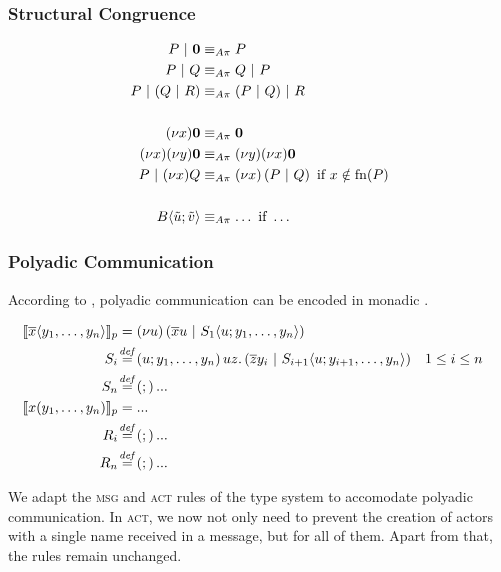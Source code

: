 \subsubsection{Structural Congruence}

\begin{align*}
  P \apar \anullproc
    &\astructequ P \\
  P \apar Q
    &\astructequ Q \apar P \\
  P \apar (Q \apar R)
    &\astructequ (P \apar Q) \apar R \\
  \\
  \anew{x}{\anullproc}
    &\astructequ \anullproc \\
  \anew{x}{\anew{y}{\anullproc}}
    &\astructequ \anew{y}{\anew{x}{\anullproc}} \\
  P \apar \anew{x}{Q}
    &\astructequ \anew*{x}{P \apar Q} \text{ if } x \notin \fn{P} \\
  \\
  \ains{B}{\tilde{u}}{\tilde{v}}
    &\astructequ \ldots \text{ if } \ldots %
\end{align*}


\subsubsection{Polyadic Communication}

According to \cite{agha_algebraic_2004},
polyadic communication can be encoded in monadic \actorpicalc.

\begin{align*}
  \encPolyAP{\asnd{x}{y_1, \ldots, y_n}}
  &= \anew*{u}{\amsnd{x}{u} \apar \ains{S_1}{u}{y_1, \ldots, y_n}}
  \\
  \adef*{S_i}{u}{y_1, \ldots, y_n}
    {\amrcv{u}{z} . \parens{\amsnd{z}{y_i} \apar \ains{S_{i+1}}{u}{y_{i+1}, \ldots, y_n}}}
    && 1 \leq i \leq n
  \\
  \adef*{S_n}{}{}{...}
  \\
  \encPolyAP{\arcv{x}{y_1, \ldots, y_n}}
  &= ...
  \\
  \adef*{R_i}{}{}{...}
  \\
  \adef*{R_n}{}{}{...}
\end{align*}


We adapt the \textsc{msg} and \textsc{act} rules of the type system
to accomodate polyadic communication.
In \textsc{act}, we now not only need to prevent the creation of actors
with a single name received in a message, but for all of them.
Apart from that, the rules remain unchanged.

